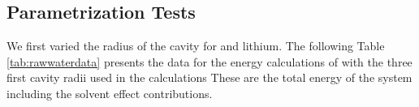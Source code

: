 \documentclass[../Thesis.tex]{subfiles}
\begin{document}
\begin{table}[!htbp]
\caption[Reaction field energy for a point charge of $\epsinf = 80$]{Reaction field energy for a point charge of $q = 3$ and $\epsinf = 80$ calculated with differing precision, transition width ($\sigma$) and cavity radius (Bohr) compared to the values from the Born model}
\label{tab:Er80}
\end{table}

\clearpage


\subsection{Parametrization Tests}\label{sec:paratests}
We first varied the radius of the cavity for  and lithium. The following
Table \ref{tab:rawwaterdata}  presents the data for the energy
calculations of  with the three first cavity radii used in the calculations
These are the total  energy of the system including the solvent effect contributions.
\end{document}
